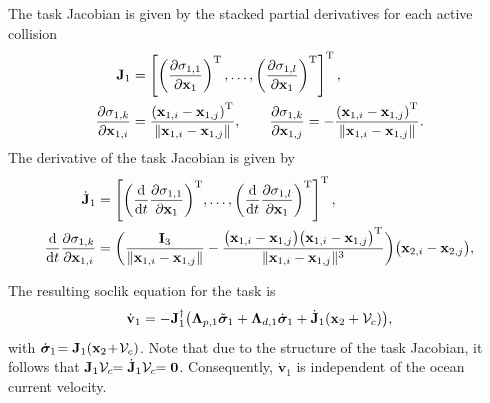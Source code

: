 The task Jacobian is given by the stacked partial derivatives for each active collision
\begin{subequations}
\begin{align}
    \mathbf{J}_1 &= \left[\left(\frac{\partial \sigma_{1,1}}{\partial \mathbf{x}_1}\right)^{\mathrm{T}}, \ldots, \left(\frac{\partial \sigma_{1,l}}{\partial \mathbf{x}_1}\right)^{\mathrm{T}}\right]^{\mathrm{T}},\\
    \frac{\partial \sigma_{1,k}}{\partial \mathbf{x}_{1,i}} &=\frac{\left(\mathbf{x}_{1,i}-\mathbf{x}_{1,j}\right) ^{\mathrm{T}}}{\|\mathbf{x}_{1,i} - \mathbf{x}_{1,j}\|}, \qquad
    \frac{\partial \sigma_{1,k}}{\partial \mathbf{x}_{1,j}} = -\frac{\left(\mathbf{x}_{1,i}-\mathbf{x}_{1,j}\right) ^{\mathrm{T}}}{\|\mathbf{x}_{1,i} - \mathbf{x}_{1,j}\|}.
\end{align}
\end{subequations}
The derivative of the task Jacobian is given by
\begin{subequations}
\begin{align}
    \dot{\mathbf{J}}_1 &= \left[{\left(\frac{{\rm d}}{{\rm d}t}\frac{\partial \sigma_{1,1}}{\partial \mathbf{x}_1}\right)}^{\mathrm{T}}, \ldots, {\left(\frac{{\rm d}}{{\rm d}t}\frac{\partial \sigma_{1,l}}{\partial \mathbf{x}_1}\right)}^{\mathrm{T}}\right]^{\mathrm{T}},\\
    {\frac{{\rm d}}{{\rm d}t}\frac{\partial \sigma_{1,k}}{\partial \mathbf{x}_{1,i}}} &= \bigg(\frac{\mathbf{I}_3}{\|\mathbf{x}_{1,i} - \mathbf{x}_{1,j}\|} - \frac{\bigl(\mathbf{x}_{1,i}-\mathbf{x}_{1,j}\bigr)\bigl(\mathbf{x}_{1,i}-\mathbf{x}_{1,j}\bigr)^{\mathrm{T}}}{\|\mathbf{x}_{1,i} - \mathbf{x}_{1,j}\|^3}\bigg)\bigl(\mathbf{x}_{2,i}-\mathbf{x}_{2,j}\bigr),
\end{align}
\end{subequations}

The resulting \gls{soclik} equation for the task is
\begin{equation}
    \dot{\mathbf{v}}_1 = -\mathbf{J}_1^\dagger \bigl( \mathbf{\Lambda}_{p,1}\Tilde{\bm{\sigma}}_1 + \mathbf{\Lambda}_{d,1} \dot{\bm{\sigma}}_1 + \dot{\mathbf{J}}_1 (\mathbf{x}_2+\mathcal{V}_c)\bigr),
\end{equation}
with $\dot{\bm{\sigma}}_{1\,} \!\!= \mathbf{J}_1 (\mathbf{x}_2\! + \!\mathcal{V}_c)$. %
Note that due to the structure of the task Jacobian, it follows that $\mathbf{J}_1 \mathcal{V}_c \!\!= \dot{\mathbf{J}}_1 \mathcal{V}_c \!\!= \mathbf{0}$. Consequently, $\dot{\mathbf{v}}_1$ is independent of the ocean current velocity.

